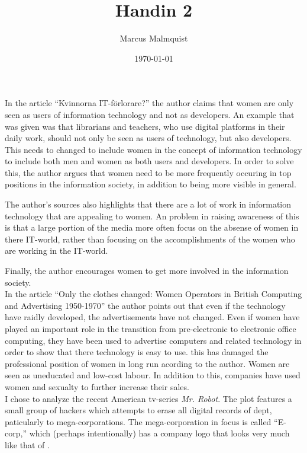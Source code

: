 \documentclass[12pt,a4paper]{IEEEtran}
\title{Handin 2}
\author{Marcus Malmquist}
\date{\today}
\begin{document}
\maketitle

\noindent In the article ``Kvinnorna IT-förlorare?'' the author claims that women are only seen as users of information technology and not as developers.
An example that was given was that librarians and teachers, who use digital platforms in their daily work, should not only be seen as users of technology, but also developers.
This needs to changed to include women in the concept of information technology to include both men and women as both users and developers.
In order to solve this, the author argues that women need to be more frequently occuring in top positions in the information society, in addition to being more visible in general.

The author's sources also highlights that there are a lot of work in information technology that are appealing to women. An problem in raising awareness of this is that a large portion of the media more often focus on the absense of women in there IT-world, rather than focusing on the accomplishments of the women who are working in the IT-world.

Finally, the author encourages women to get more involved in the information society.\\

\noindent In the article ``Only the clothes changed: Women Operators in British Computing and Advertising 1950-1970'' the author points out that even if the technology have raidly developed, the advertisements have not changed.
Even if women have played an important role in the transition from pre-electronic to electronic office computing, they have been used to advertise computers and related technology in order to show that there technology is easy to use.
this has damaged the professional position of women in long run acording to the author.
Women are seen as uneducated and low-cost labour. In addition to this, companies have used women and sexualty to further increase their sales.\\

\noindent I chose to analyze the recent American tv-series \textit{Mr. Robot}.
The plot features a small group of hackers which attempts to erase all digital records of dept, paticularly to mega-corporations.
The mega-corporation in focus is called ``E-corp,'' which (perhaps intentionally) has a company logo that looks very much like that of .
\end{document}
